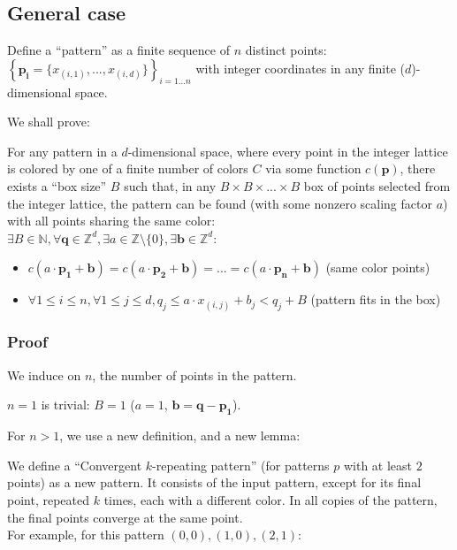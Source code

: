 \documentclass[11pt]{article}
\newcommand{\N}{\mathbb{N}}
\newcommand{\Z}{\mathbb{Z}}
\newcommand*{\scalePic}{0.4}
\newcommand*{\gridArg}[7]{%
    \foreach \x in {\fpeval{#1},\fpeval{#1+#2},...,\fpeval{#3+0.0001}} %
        \draw [black, thin, #7] (\x,\fpeval{#4}) -- (\x,\fpeval{#6+0.0001});
    \foreach \y in {\fpeval{#4},\fpeval{#4+#5},...,\fpeval{#6+0.0001}}
        \draw [black, thin, #7] (\fpeval{#1},\y) -- (\fpeval{#3+0.0001},\y);
}
\newcommand*{\grid}[6]{\gridArg{#1}{#2}{#3}{#4}{#5}{#6}{}}%
\newcommand*{\mybigbox}[4]{\grid{#1}{#3}{#1+#3}{#2}{#4}{#2+#4}} %
\newcommand*{\point}[3]{\node at (#1 + 0.5, #2 + 0.5)[circle, fill, inner sep=\scalePic*5pt, #3]{}; \gridArg{#1}{1}{#1+1}{#2}{1}{#2+1}{draw=none}}
\newcommand*{\blue}{blue!60!green}
\begin{document}
\pagebreak
\subsection*{General case}

Define a ``pattern'' as a finite sequence of $n$ distinct points:\\
$\left\{\mathbf{p_i} = \{x_{(i,1)}, ..., x_{(i,d)}\}\right\}_{i=1...n}$ with integer coordinates in any finite ($d$)-dimensional space.

We shall prove:

For any pattern in a $d$-dimensional space, where every point in the integer lattice is colored by one of a finite number of colors $C$ via some function $c(\mathbf{p})$, there exists a ``box size'' $B$ such that, in any $B \times B \times ... \times B$ box of points selected from the integer lattice, the pattern can be found (with some nonzero scaling factor $a$) with all points sharing the same color:\\
$\exists B \in \N, \forall \mathbf{q} \in \Z^{d}, \exists a \in \Z \setminus \{ 0 \}, \exists \mathbf{b} \in \Z^{d}$:
\begin{itemize}
\item $c(a \cdot \mathbf{p_1} + \mathbf{b}) = c(a \cdot \mathbf{p_2} + \mathbf{b}) = ... = c(a \cdot \mathbf{p_n} + \mathbf{b})$ (same color points)
\item $\forall 1 \leq i \leq n, \forall 1 \leq j \leq d, q_j \leq a \cdot x_{(i,j)} + b_j < q_j + B$ (pattern fits in the box)
\end{itemize}


\subsubsection*{Proof}
We induce on $n$, the number of points in the pattern.

$n=1$ is trivial: $B=1$ ($a=1$, $\mathbf{b} = \mathbf{q} - \mathbf{p_1}$).

For $n>1$, we use a new definition, and a new lemma:

We define a ``Convergent $k$-repeating pattern'' (for patterns $p$ with at least $2$ points) as a new pattern. It consists of the input pattern, except for its final point, repeated $k$ times, each with a different color. In all copies of the pattern, the final points converge at the same point.\\
For example, for this pattern $(0,0), (1,0), (2,1)$:
\end{document}
